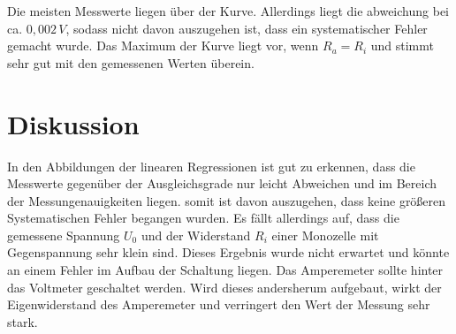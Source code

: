 Die meisten Messwerte liegen über der Kurve.
Allerdings liegt die abweichung bei ca. $0,002\, V$, sodass nicht davon auszugehen ist,
dass  ein systematischer Fehler gemacht wurde.
Das Maximum der Kurve liegt vor, wenn $R_a = R_i$
und stimmt sehr gut mit den gemessenen Werten überein.

\section{Diskussion}

In den Abbildungen der linearen Regressionen ist gut zu erkennen,
dass die Messwerte gegenüber der Ausgleichsgrade nur leicht Abweichen
und im Bereich der Messungenauigkeiten liegen.
somit ist davon auszugehen, dass keine größeren Systematischen Fehler begangen wurden.
Es fällt allerdings auf, dass die gemessene Spannung $U_0$ und der Widerstand $R_i$ einer Monozelle
 mit Gegenspannung sehr klein sind.
 Dieses Ergebnis wurde nicht erwartet und könnte an einem Fehler im Aufbau der Schaltung liegen.
 Das Amperemeter sollte hinter das Voltmeter geschaltet werden.
 Wird dieses andersherum aufgebaut, wirkt der Eigenwiderstand des Amperemeter
 und verringert den Wert der Messung sehr stark.
